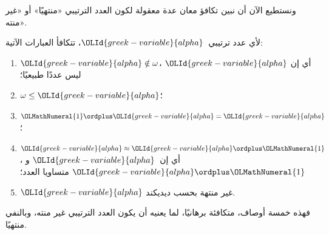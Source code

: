 \documentclass[../../../include/open-logic-section]{subfiles}
\begin{document}
ونستطيع الآن أن نبين تكافؤ معان عدة معقولة لكون العدد الترتيبي
«منتهيًا» أو «غير منته».

\begin{lem}
لأي عدد ترتيبي~$\OLId{greek-variable}{alpha}$، تتكافأ العبارات الآتية:
\begin{enumerate}
	\item{} $\OLId{greek-variable}{alpha}\notin \omega$، أي إن
	$\OLId{greek-variable}{alpha}$ ليس عددًا طبيعيًا؛
	\item{} $\omega \leq \OLId{greek-variable}{alpha}$؛
	\item{} $\OLMathNumeral{1} \ordplus \OLId{greek-variable}{alpha} = \OLId{greek-variable}{alpha}$؛
	\item{} $\OLId{greek-variable}{alpha} \approx \OLId{greek-variable}{alpha}\ordplus \OLMathNumeral{1}$، أي
	إن~$\OLId{greek-variable}{alpha}$ و$\OLId{greek-variable}{alpha}\ordplus \OLMathNumeral{1}$ متساويا العدد؛
	\item{} $\OLId{greek-variable}{alpha}$ غير منتهة بحسب ديديكند.
	\end{enumerate}
\end{lem}
\noindent
فهذه خمسة أوصاف، متكافئة برهانيًا، لما يعنيه أن يكون العدد الترتيبي
غير منته، وبالنفي منتهيًا.
\end{document}
